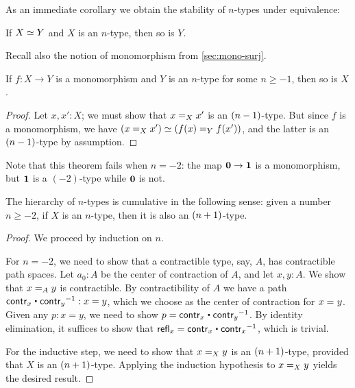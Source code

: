 As an immediate corollary we obtain the stability of $n$-types under equivalence:

\begin{cor}\label{cor:preservation-hlevels-weq}
 If $\eqv{X}{Y}$ and $X$ is an $n$-type, then so is $Y$.
\end{cor}

Recall also the notion of monomorphism from \autoref{sec:mono-surj}.

\begin{thm}\label{thm:isntype-mono}
  If $f:X\to Y$ is a monomorphism and $Y$ is an $n$-type for some $n\ge -1$, then so is $X$.
\end{thm}
\begin{proof}
  Let $x,x':X$; we must show that $\id[X]{x}{x'}$ is an $\nminusone$-type.
  But since $f$ is a monomorphism, we have $(\id[X]{x}{x'}) \simeq (\id[Y]{f(x)}{f(x')})$, and the latter is an $\nminusone$-type by assumption.
\end{proof}

Note that this theorem fails when $n=-2$: the map $\emptyt \to \unit$ is a monomorphism, but $\unit$ is a $(-2)$-type while $\emptyt$ is not.

\begin{thm}\label{thm:hlevel-cumulative}
 The hierarchy of $n$-types is cumulative in the following sense:
   given a number $n \geq -2$, if $X$ is an $n$-type, then it is also an $\nplusone$-type.
\end{thm}

\begin{proof}
 We proceed by induction on $n$.

 For $n = -2$, we need to show that a contractible type, say, $A$, has contractible path spaces.
       Let $a_0: A$ be the center of contraction of $A$, and let $x, y : A$. We show that $\id[A]{x}{y}$
       is contractible.
       By contractibility of $A$ we have a path $\contr_x \ct \opp{\contr_y} : x = y$, which we choose as
       the center of contraction for $\id{x}{y}$.
       Given any $p : x = y$, we need to show $p = \contr_x \ct \opp{\contr_y}$.
           By identity elimination, it suffices to show that
        $\refl{x} = \contr_x \ct \opp{\contr_x}$, which is trivial.

 For the inductive step, we need to show that $\id[X]{x}{y}$ is an $\nplusone$-type, provided
          that $X$ is an $\nplusone$-type. Applying the induction hypothesis to $\id[X]{x}{y}$
         yields the desired result.
\end{proof}

